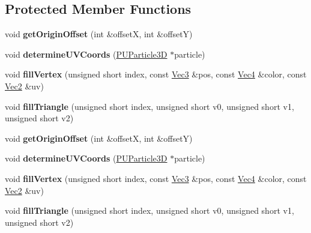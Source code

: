 \subsection*{Protected Member Functions}
\begin{DoxyCompactItemize}
\item 
\mbox{\label{classPUParticle3DQuadRender_ac8279bcd06facf2c68216bf099fcd9a0}} 
void {\bfseries get\+Origin\+Offset} (int \&offsetX, int \&offsetY)
\item 
\mbox{\label{classPUParticle3DQuadRender_a0d17646bdf55ceb92124fbbb8a3268c3}} 
void {\bfseries determine\+U\+V\+Coords} (\hyperlink{structPUParticle3D}{P\+U\+Particle3D} $\ast$particle)
\item 
\mbox{\label{classPUParticle3DQuadRender_a5e66d9e5fa8b78aa6f4c1165b2484bdf}} 
void {\bfseries fill\+Vertex} (unsigned short index, const \hyperlink{classVec3}{Vec3} \&pos, const \hyperlink{classVec4}{Vec4} \&color, const \hyperlink{classVec2}{Vec2} \&uv)
\item 
\mbox{\label{classPUParticle3DQuadRender_ab9b00c8c9c009362f9e191bf8936d61d}} 
void {\bfseries fill\+Triangle} (unsigned short index, unsigned short v0, unsigned short v1, unsigned short v2)
\item 
\mbox{\label{classPUParticle3DQuadRender_ac8279bcd06facf2c68216bf099fcd9a0}} 
void {\bfseries get\+Origin\+Offset} (int \&offsetX, int \&offsetY)
\item 
\mbox{\label{classPUParticle3DQuadRender_a0d17646bdf55ceb92124fbbb8a3268c3}} 
void {\bfseries determine\+U\+V\+Coords} (\hyperlink{structPUParticle3D}{P\+U\+Particle3D} $\ast$particle)
\item 
\mbox{\label{classPUParticle3DQuadRender_a5e66d9e5fa8b78aa6f4c1165b2484bdf}} 
void {\bfseries fill\+Vertex} (unsigned short index, const \hyperlink{classVec3}{Vec3} \&pos, const \hyperlink{classVec4}{Vec4} \&color, const \hyperlink{classVec2}{Vec2} \&uv)
\item 
\mbox{\label{classPUParticle3DQuadRender_ab9b00c8c9c009362f9e191bf8936d61d}} 
void {\bfseries fill\+Triangle} (unsigned short index, unsigned short v0, unsigned short v1, unsigned short v2)
\end{DoxyCompactItemize}
